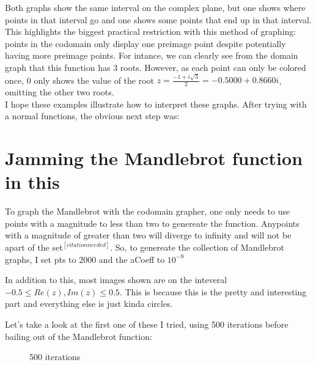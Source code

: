 \documentclass[letterpaper,12pt]{article}
\begin{document}
Both graphs show the same interval on the complex plane, but one shows where points in that interval go and one shows some points that end up in that interval.
This highlights the biggest practical restriction with this method of graphing: points in the codomain only display one preimage point despite potentially having more preimage points.
For intance, we can clearly see from the domain graph that this function has 3 roots.
However, as each point can only be colored once, 0 only shows the value of the root $z= \frac{-1 + i\sqrt{3}}{2} = -0.5000 + 0.8660i$, omitting the other two roots. \\

I hope these examples illustrate how to interpret these graphs.
After trying with a normal functions, the obvious next step was:

\section{Jamming the Mandlebrot function in this}

To graph the Mandlebrot with the codomain grapher, one only needs to use points with a magnitude to less than two to genereate the function.
Anypoints with a magnitude of greater than two will diverge to infinity and will not be apart of the set$^{[citation needed]}$.
So, to genereate the collection of Mandlebrot graphs, I set pts to 2000 and the aCoeff to $10^{-9}$

In addition to this, most images shown are on the inteveral $ -0.5 \leq Re(z), Im(z) \leq 0.5$.
This is because this is the pretty and interesting part and everything else is just kinda circles.

Let's take a look at the first one of these I tried, using 500 iterations before bailing out of the Mandlebrot function:

\begin{figure}[h]
	\noindent{}
	\centering
	\caption{500 iterations}
	\centering
\end{figure}
\end{document}
